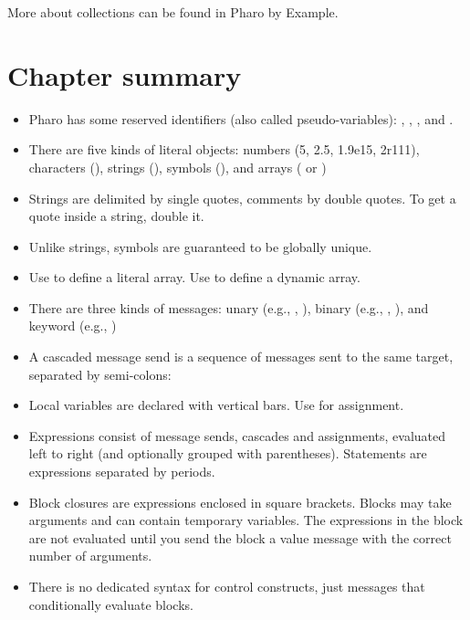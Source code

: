 \documentclass[10pt,twoside,english]{_support/latex/sbabook/sbabook}
\begin{document}

More about collections can be found in Pharo by Example.
\section{Chapter summary}
\begin{itemize}
\item Pharo has  some reserved identifiers (also called pseudo-variables): , , ,  and .
\item There are five kinds of literal objects: numbers (5, 2.5, 1.9e15, 2r111), characters (), strings (), symbols (), and arrays ( or  )
\item Strings are delimited by single quotes, comments by double quotes. To get a quote inside a string, double it.
\item Unlike strings, symbols are guaranteed to be globally unique.
\item Use  to define a literal array. Use  to define a dynamic array.  
\item There are three kinds of messages: unary (e.g., , ), binary (e.g., , ), and keyword (e.g., )
\item A cascaded message send is a sequence of messages sent to the same target, separated by semi-colons: 
\item Local variables are declared with vertical bars. Use \textcode{:= } for assignment. 
\item Expressions consist of message sends, cascades and assignments, evaluated left to right (and optionally grouped with parentheses). Statements are expressions separated by periods.
\item Block closures are expressions enclosed in square brackets. Blocks may take arguments and can contain temporary variables. The expressions in the block are not evaluated until you send the block a value message with the correct number of arguments. 
\item There is no dedicated syntax for control constructs, just messages that conditionally evaluate blocks.
\end{itemize}


\backmatter



\end{document}
